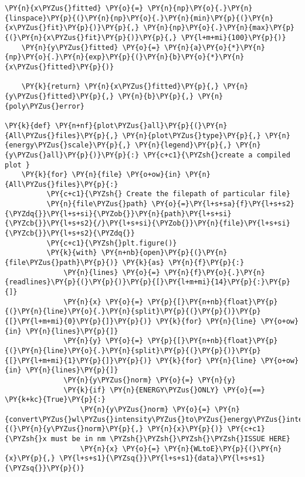 \begin{tcolorbox}[breakable, size=fbox, boxrule=1pt, pad at break*=1mm,colback=cellbackground, colframe=cellborder]
\begin{Verbatim}[commandchars=\\\{\}]
    \PY{n}{x\PYZus{}fitted} \PY{o}{=} \PY{n}{np}\PY{o}{.}\PY{n}{linspace}\PY{p}{(}\PY{n}{np}\PY{o}{.}\PY{n}{min}\PY{p}{(}\PY{n}{x\PYZus{}fit}\PY{p}{)}\PY{p}{,} \PY{n}{np}\PY{o}{.}\PY{n}{max}\PY{p}{(}\PY{n}{x\PYZus{}fit}\PY{p}{)}\PY{p}{,} \PY{l+m+mi}{100}\PY{p}{)}
    \PY{n}{y\PYZus{}fitted} \PY{o}{=} \PY{n}{a}\PY{o}{*}\PY{n}{np}\PY{o}{.}\PY{n}{exp}\PY{p}{(}\PY{n}{b}\PY{o}{*}\PY{n}{x\PYZus{}fitted}\PY{p}{)}
    
    \PY{k}{return} \PY{n}{x\PYZus{}fitted}\PY{p}{,} \PY{n}{y\PYZus{}fitted}\PY{p}{,} \PY{n}{b}\PY{p}{,} \PY{n}{poly\PYZus{}error}

\PY{k}{def} \PY{n+nf}{plot\PYZus{}all}\PY{p}{(}\PY{n}{All\PYZus{}files}\PY{p}{,} \PY{n}{plot\PYZus{}type}\PY{p}{,} \PY{n}{energy\PYZus{}scale}\PY{p}{,} \PY{n}{legend}\PY{p}{,} \PY{n}{y\PYZus{}all}\PY{p}{)}\PY{p}{:} \PY{c+c1}{\PYZsh{}create a compiled plot }
    \PY{k}{for} \PY{n}{file} \PY{o+ow}{in} \PY{n}{All\PYZus{}files}\PY{p}{:}                               
          \PY{c+c1}{\PYZsh{} Create the filepath of particular file}
          \PY{n}{file\PYZus{}path} \PY{o}{=}\PY{l+s+sa}{f}\PY{l+s+s2}{\PYZdq{}}\PY{l+s+si}{\PYZob{}}\PY{n}{path}\PY{l+s+si}{\PYZcb{}}\PY{l+s+s2}{/}\PY{l+s+si}{\PYZob{}}\PY{n}{file}\PY{l+s+si}{\PYZcb{}}\PY{l+s+s2}{\PYZdq{}}
          \PY{c+c1}{\PYZsh{}plt.figure()}
          \PY{k}{with} \PY{n+nb}{open}\PY{p}{(}\PY{n}{file\PYZus{}path}\PY{p}{)} \PY{k}{as} \PY{n}{f}\PY{p}{:}
              \PY{n}{lines} \PY{o}{=} \PY{n}{f}\PY{o}{.}\PY{n}{readlines}\PY{p}{(}\PY{p}{)}\PY{p}{[}\PY{l+m+mi}{14}\PY{p}{:}\PY{p}{]}
              \PY{n}{x} \PY{o}{=} \PY{p}{[}\PY{n+nb}{float}\PY{p}{(}\PY{n}{line}\PY{o}{.}\PY{n}{split}\PY{p}{(}\PY{p}{)}\PY{p}{[}\PY{l+m+mi}{0}\PY{p}{]}\PY{p}{)} \PY{k}{for} \PY{n}{line} \PY{o+ow}{in} \PY{n}{lines}\PY{p}{]}
              \PY{n}{y} \PY{o}{=} \PY{p}{[}\PY{n+nb}{float}\PY{p}{(}\PY{n}{line}\PY{o}{.}\PY{n}{split}\PY{p}{(}\PY{p}{)}\PY{p}{[}\PY{l+m+mi}{1}\PY{p}{]}\PY{p}{)} \PY{k}{for} \PY{n}{line} \PY{o+ow}{in} \PY{n}{lines}\PY{p}{]}
              \PY{n}{y\PYZus{}norm} \PY{o}{=} \PY{n}{y}
              \PY{k}{if} \PY{n}{ENERGY\PYZus{}ONLY} \PY{o}{==} \PY{k+kc}{True}\PY{p}{:}
                  \PY{n}{y\PYZus{}norm} \PY{o}{=} \PY{n}{convert\PYZus{}wl\PYZus{}intensity\PYZus{}to\PYZus{}energy\PYZus{}intensity}\PY{p}{(}\PY{n}{y\PYZus{}norm}\PY{p}{,} \PY{n}{x}\PY{p}{)} \PY{c+c1}{\PYZsh{}x must be in nm \PYZsh{}\PYZsh{}\PYZsh{}\PYZsh{}ISSUE HERE}
                  \PY{n}{x} \PY{o}{=} \PY{n}{WLtoE}\PY{p}{(}\PY{n}{x}\PY{p}{,} \PY{l+s+s1}{\PYZsq{}}\PY{l+s+s1}{data}\PY{l+s+s1}{\PYZsq{}}\PY{p}{)}
                  

\end{Verbatim}
\end{tcolorbox}
